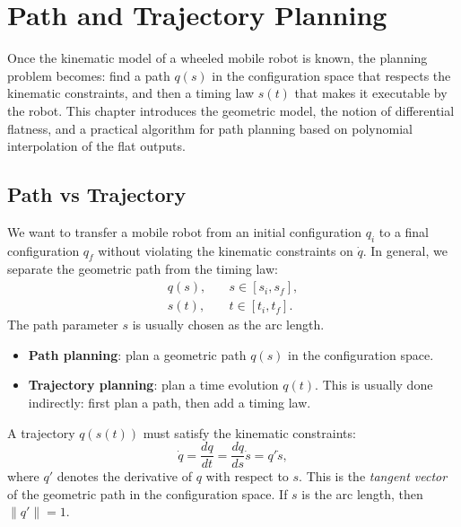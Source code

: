 \chapter{Path and Trajectory Planning}
\label{ch:path-trajectory}

Once the kinematic model of a wheeled mobile robot is known, the
planning problem becomes: find a path \( q(s) \) in the configuration
space that respects the kinematic constraints, and then a timing law
\( s(t) \) that makes it executable by the robot. This chapter
introduces the geometric model, the notion of differential flatness,
and a practical algorithm for path planning based on polynomial
interpolation of the flat outputs.

\section{Path vs Trajectory}
\label{sec:path-vs-trajectory}

We want to transfer a mobile robot from an initial configuration
\( q_i \) to a final configuration \( q_f \) without violating the
kinematic constraints on \( \dot{q} \). In general, we separate the
geometric path from the timing law:
\begin{align}
    q(s), \quad & s \in [s_i, s_f], \\
    s(t), \quad & t \in [t_i, t_f].
\end{align}
The path parameter \( s \) is usually chosen as the arc length.

\begin{itemize}
    \item \textbf{Path planning}: plan a geometric path \( q(s) \) in
          the configuration space.
    \item \textbf{Trajectory planning}: plan a time evolution
          \( q(t) \). This is usually done indirectly: first plan a
          path, then add a timing law.
\end{itemize}

A trajectory \( q(s(t)) \) must satisfy the kinematic constraints:
\begin{equation}
    \dot{q} = \frac{dq}{dt} = \frac{dq}{ds} \dot{s} = q' \dot{s},
\end{equation}
where \( q' \) denotes the derivative of \( q \) with respect to
\( s \). This is the \emph{tangent vector} of the geometric path in
the configuration space. If \( s \) is the arc length, then
\( \|q'\| = 1 \).

